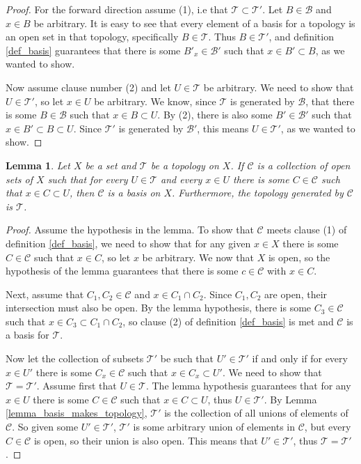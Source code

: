 \documentclass{article}
\newtheorem{lemma}{Lemma}[subsection]
\theoremstyle{definition}
\theoremstyle{remark}
\newcommand{\prt}[1]{\mathcal{#1}}
\begin{document}
\begin{proof}
    For the forward direction assume (1), i.e that $\prt{T} \subset \prt{T'}$. Let $B \in \prt{B}$ and $x \in B$ be arbitrary. It is easy to see that every element of a basis for a topology is an open set in that topology, specifically $B \in \prt{T}$. Thus $B \in \prt{T'}$, and definition \ref{def_basis} guarantees that there is some $B'_x \in \prt{B'}$ such that $x \in B' \subset B$, as we wanted to show.
    
    Now assume clause number (2) and let $U \in \prt{T}$ be arbitrary. We need to show that $U \in \prt{T'}$, so let $x \in U$ be arbitrary. We know, since $\prt{T}$ is generated by $\prt{B}$, that there is some $B \in \prt{B}$ such that $x \in B \subset U$. By (2), there is also some $B' \in \prt{B'}$ such that $x \in B' \subset B \subset U$. Since $\prt{T'}$ is generated by $\prt{B'}$, this means $U \in \prt{T'}$, as we wanted to show.
\end{proof}


\begin{lemma} \label{lemma_collection_is_basis}
    Let $X$ be a set and $\prt{T}$ be a topology on $X$. If $\prt{C}$ is a collection of open sets of $X$ such that for every $U \in \prt{T}$ and every $x \in U$ there is some $C \in \prt{C}$ such that $x \in C \subset U$, then $\prt{C}$ is a basis on $X$. Furthermore, the topology generated by $\prt{C}$ is $\prt{T}$.
\end{lemma}

\begin{proof}
    Assume the hypothesis in the lemma. To show that $\prt{C}$ meets clause (1) of definition \ref{def_basis}, we need to show that for any given $x \in X$ there is some $C \in \prt{C}$ such that $x \in C$, so let $x$ be arbitrary. We now that $X$ is open, so the hypothesis of the lemma guarantees that there is some $c \in \prt{C}$ with $x \in C$.
    
    Next, assume that $C_1, C_2 \in \prt{C}$ and $x \in C_1 \cap C_2$. Since $C_1, C_2$ are open, their intersection must also be open. By the lemma hypothesis, there is some $C_3 \in \prt{C}$ such that $x \in C_3 \subset C_1 \cap C_2$, so clause (2) of definition \ref{def_basis} is met and $\prt{C}$ is a basis for $\prt{T}$.
    
    Now let the collection of subsets $\prt{T'}$ be such that $U' \in \prt{T'}$ if and only if for every $x \in U'$ there is some $C_x \in \prt{C}$ such that $x \in C_x \subset U'$. We need to show that $\prt{T} = \prt{T'}$. Assume first that $U \in \prt{T}$. The lemma hypothesis guarantees that for any $x \in U$ there is some $C \in \prt{C}$ such that $x \in C \subset U$, thus $U \in \prt{T'}$. By Lemma \ref{lemma_basis_makes_topology}, $\prt{T'}$ is the collection of all unions of elements of $\prt{C}$. So given some $U' \in \prt{T'}$, $\prt{T'}$ is some arbitrary union of elements in $\prt{C}$, but every $C \in \prt{C}$ is open, so their union is also open. This means that $U' \in \prt{T'}$, thus $\prt{T} = \prt{T'}$.
\end{proof}
\end{document}
